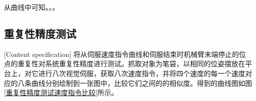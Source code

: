 \documentclass[fontset=fandol,type=bachelor,campus=harbin,bsmainpagenumberline=true]{hithesisbook}
\begin{document}
从曲线中可知。。。

\subsection{重复性精度测试}[Content specification]
将从伺服速度指令曲线和伺服结束时机械臂末端停止的位点的重复性对系统重复性精度进行测试。抓取对象为笔袋，以相同的位姿摆放在平台上，对它进行八次视觉伺服，获取八次速度指令，并将四个速度的每一个速度对应的八条曲线分别绘制到一张图中，比较它们之间的的相似度。得到的曲线图如图\ref{重复性精度测试速度指令比较}所示。
\begin{figure}[h]
	\centering
\end{figure}
\end{document}
